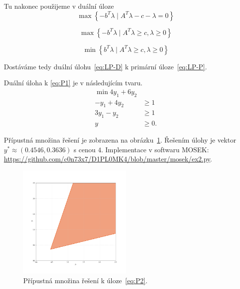 \noindent Tu nakonec použijeme v duální úloze
\begin{equation*}
    \max \left\{ -b^T\lambda \mid A^T\lambda -c - \lambda = 0 \right\}
\end{equation*}

\begin{equation*}
    \max \left\{ -b^T\lambda \mid A^T\lambda \geq c, \lambda \geq 0 \right\}
\end{equation*}

\begin{equation}\tag{LP-D}
    \min \left\{ b^T\lambda \mid A^T\lambda \geq c, \lambda \geq 0 \right\}
    \label{eq:LP-D}
\end{equation}

\noindent Dostáváme tedy duální úlohu~\ref{eq:LP-D} k primární úloze~\ref{eq:LP-P}.

\begin{pr}
Duální úloha k \ref{eq:P1} je v následujícím tvaru.
\begin{equation}\tag{P2}
    \begin{split}
        \min 4 y_1 + 6 y_2 &       \\
        - y_1 + 4 y_2      &\geq 1 \\
        3 y_1 -   y_2      &\geq 1 \\
        y &\geq 0.
    \end{split}
    \label{eq:P2}
\end{equation}

Přípustná množina řešení je zobrazena na obrázku~\ref{fig:ex2}. Řešením úlohy je vektor $y^* \approx (0.4546, 0.3636)$ s cenou $4$. Implementace v softwaru MOSEK: \url{https://github.com/c0n73x7/D1PL0MK4/blob/master/mosek/ex2.py}.
\end{pr}

\begin{figure}[h!]
    \centering
    \includegraphics[width=0.5\textwidth]{img/ex2.png}   
    \caption{Přípustná množina řešení k úloze~\ref{eq:P2}.}
    \label{fig:ex2}
\end{figure}

